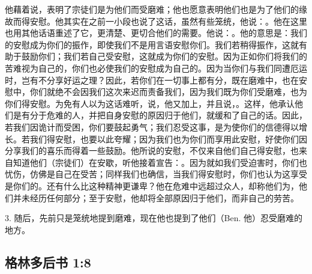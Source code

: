 他藉着说，表明了宗徒们是为他们而受磨难；他也愿意表明他们也是为了他们的缘故而得安慰。他其实在之前一小段也说了这话，虽然有些笼统，他说：。他在这里也用其他话语重述了它，更清楚、更切合他们的需要。他说：。他的意思是：我们的安慰成为你们的振作，即使我们不是用言语安慰你们。我们若稍得振作，这就有助于鼓励你们；我们若自己受安慰，这就成为你们的安慰。因为正如你们将我们的苦难视为自己的，你们也必使我们的安慰成为自己的。因为当你们与我们同遭厄运时，岂有不分享好运之理？因此，若你们在一切事上都有分，既在磨难中，也在安慰中，你们就绝不会因我们这次来迟而责备我们，因为我们既为你们受磨难，也为你们得安慰。为免有人以为这话难听，说，他又加上，并且说，。这样，他承认他们是有分于危难的人，并把自身安慰的原因归于他们，就缓和了自己的话。因此，若我们因诡计而受困，你们要鼓起勇气；我们忍受这事，是为使你们的信德得以增长。若我们得安慰，也要以此夸耀；因为我们也为你们而享用此安慰，好使你们因分享我们的喜乐而得着一些鼓励。他所说的安慰，不仅来自他们自己得安慰，也来自知道他们（宗徒们）在安歇，听他接着宣告：。因为就如我们受迫害时，你们也忧伤，仿佛是自己在受苦；同样我们也确信，当我们得安慰时，你们也认为这享受是你们的。还有什么比这种精神更谦卑？他在危难中远超过众人，却称他们为，他们并未经历任何部分；至于安慰，他却将全部原因归于他们，而非自己的劳苦。\par

3. 随后，先前只是笼统地提到磨难，现在他也提到了他们（Ben. 他）忍受磨难的地方。\par


\subsection{格林多后书 1:8}

\par

